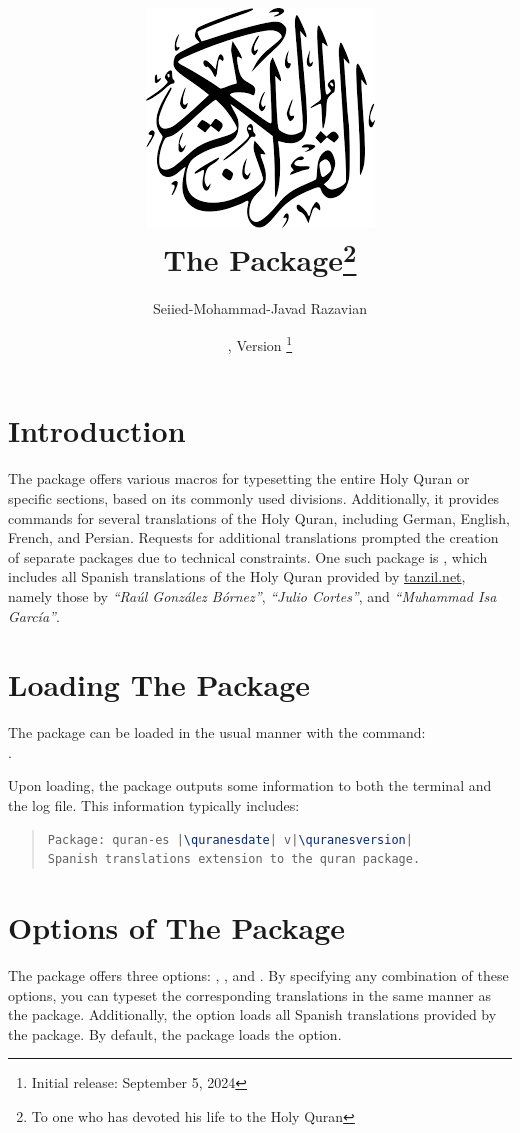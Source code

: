 \documentclass[a4paper]{ltxdoc}
\title{\includegraphics[scale=.3]{quran.png}\\
The \xpackage{quran-es} Package\footnote{To one who has devoted his life to the Holy Quran}\\
}
\author{Seiied-Mohammad-Javad Razavian\\\xemail{javadr@gmail.com}}
\date{\quranesdate,  Version \quranesversion\footnote{Initial release: September 5, 2024}}
\begin{document}
\maketitle

\tableofcontents

\section{Introduction}

The  package offers various macros for typesetting the entire Holy Quran or specific sections, 
based on its commonly used divisions. Additionally, it provides commands for several translations 
of the Holy Quran, including German, English, French, and Persian. 
Requests for additional translations prompted the creation of separate packages due to technical constraints. 
One such package is , which includes all Spanish translations of the Holy Quran provided by 
\href{https://tanzil.net}{tanzil.net}, 
namely those by \emph{``Raúl González Bórnez''}, \emph{``Julio Cortes''}, and \emph{``Muhammad Isa García''}.


\section{Loading The Package}

The package can be loaded in the usual manner with the command:\\
. 

Upon loading, the package outputs some information to both the terminal and the log file. 
This information typically includes:


\begin{quote}
\begin{lstlisting}[style=BashInputStyle, language=tex, escapechar={|}]
Package: quran-es |\quranesdate| v|\quranesversion|
Spanish translations extension to the quran package.
\end{lstlisting}
\end{quote}


\section{Options of The Package}\label{sec:qurantypesetting}

%
%
The package offers three options: , , and .
By specifying any combination of these options, you can typeset the corresponding translations 
in the same manner as the  package. Additionally, the  option loads all 
Spanish translations provided by the  package. 
By default, the package loads the  option.
\end{document}
